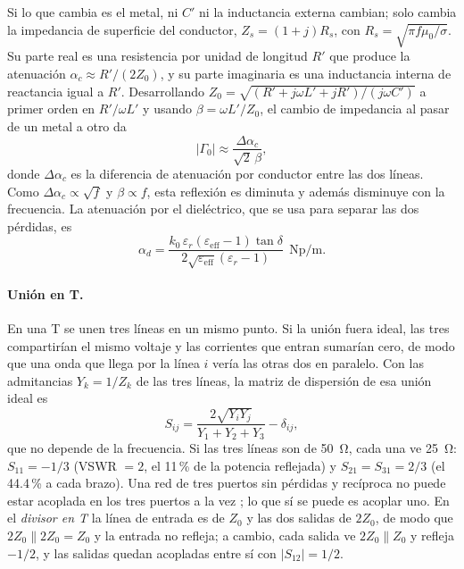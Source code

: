 \documentclass[11pt,letterpaper]{article}
\begin{document}
Si lo que cambia es el metal, ni $C'$ ni la inductancia externa cambian; solo cambia la impedancia de superficie del conductor, $Z_s=(1+j)R_s$, con $R_s=\sqrt{\pi f\mu_0/\sigma}$. Su parte real es una resistencia por unidad de longitud $R'$ que produce la atenuación $\alpha_c\approx R'/(2Z_0)$, y su parte imaginaria es una inductancia interna de reactancia igual a $R'$. Desarrollando $Z_0=\sqrt{(R'+j\omega L'+jR')/(j\omega C')}$ a primer orden en $R'/\omega L'$ y usando $\beta=\omega L'/Z_0$, el cambio de impedancia al pasar de un metal a otro da
\begin{equation}
|\Gamma_0| \approx \frac{\Delta\alpha_c}{\sqrt{2}\,\beta},
\label{eq:gsn}
\end{equation}
donde $\Delta\alpha_c$ es la diferencia de atenuación por conductor entre las dos líneas. Como $\Delta\alpha_c\propto\sqrt{f}$ y $\beta\propto f$, esta reflexión es diminuta y además disminuye con la frecuencia. La atenuación por el dieléctrico, que se usa para separar las dos pérdidas, es \cite{pozar}
\begin{equation}
\alpha_d = \frac{k_0\,\varepsilon_r\left(\varepsilon_{\mathrm{eff}}-1\right)\tan\delta}{2\sqrt{\varepsilon_{\mathrm{eff}}}\left(\varepsilon_r-1\right)}\ \ \mathrm{Np/m}.
\label{eq:alfad}
\end{equation}

\paragraph{Unión en T.} En una T se unen tres líneas en un mismo punto. Si la unión fuera ideal, las tres compartirían el mismo voltaje y las corrientes que entran sumarían cero, de modo que una onda que llega por la línea $i$ vería las otras dos en paralelo. Con las admitancias $Y_k=1/Z_k$ de las tres líneas, la matriz de dispersión de esa unión ideal es \cite{pozar}
\begin{equation}
S_{ij} = \frac{2\sqrt{Y_iY_j}}{Y_1+Y_2+Y_3} - \delta_{ij},
\label{eq:tideal}
\end{equation}
que no depende de la frecuencia. Si las tres líneas son de \SI{50}{\ohm}, cada una ve \SI{25}{\ohm}: $S_{11}=-1/3$ (VSWR $=2$, el 11\,\% de la potencia reflejada) y $S_{21}=S_{31}=2/3$ (el 44.4\,\% a cada brazo). Una red de tres puertos sin pérdidas y recíproca no puede estar acoplada en los tres puertos a la vez \cite{pozar}; lo que sí se puede es acoplar uno. En el \emph{divisor en T} la línea de entrada es de $Z_0$ y las dos salidas de $2Z_0$, de modo que $2Z_0\parallel 2Z_0=Z_0$ y la entrada no refleja; a cambio, cada salida ve $2Z_0\parallel Z_0$ y refleja $-1/2$, y las salidas quedan acopladas entre sí con $|S_{12}|=1/2$.
\end{document}
